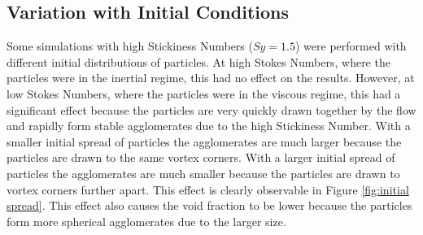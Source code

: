 \documentclass[a4paper,11pt,titlepage]{report}
\begin{document}
\subsection{Variation with Initial Conditions}
\label{sec:variation with initial conditions}
Some simulations with high Stickiness Numbers ($Sy = 1.5$) were performed with different initial distributions of particles. At high Stokes Numbers, where the particles were in the inertial regime, this had no effect on the results. However, at low Stokes Numbers, where the particles were in the viscous regime, this had a significant effect because the particles are very quickly drawn together by the flow and rapidly form stable agglomerates due to the high Stickiness Number. With a smaller initial spread of particles the agglomerates are much larger because the particles are drawn to the same vortex corners. With a larger initial spread of particles the agglomerates are much smaller because the particles are drawn to vortex corners further apart. This effect is clearly observable in Figure \ref{fig:initial spread}. This effect also causes the void fraction to be lower because the particles form more spherical agglomerates due to the larger size.
\end{document}
